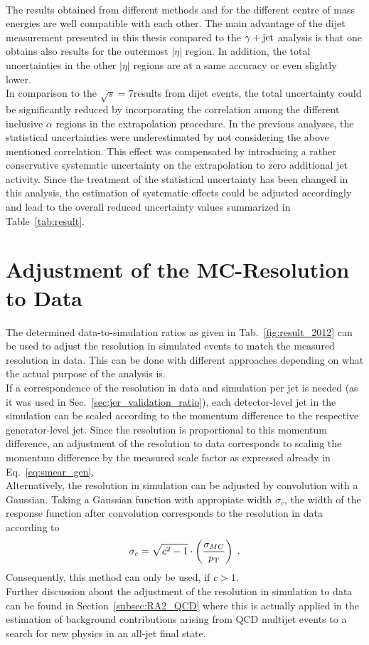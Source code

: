 \\
The results obtained from different methods and for the different centre of mass energies are well compatible with each other. The main advantage of the dijet measurement presented in this thesis compared to the $\gamma +\rm{jet}$ analysis is that one obtains also results for the outermost $|\eta|$ region. In addition, the total uncertainties in the other $|\eta|$ regions are at a same accuracy or even slightly lower. \\
In comparison to the $\sqrt{s}=7$\tev results from dijet events, the total uncertainty could be significantly reduced by incorporating the correlation among the different inclusive $\alpha$ regions in the extrapolation procedure. In the previous analyses, the statistical uncertainties were underestimated by not considering the above mentioned correlation. This effect was compensated by introducing a rather conservative systematic uncertainty on the extrapolation to zero additional jet activity. Since the treatment of the statistical uncertainty has been changed in this analysis, the estimation of systematic effects could be adjusted accordingly and lead to the overall reduced uncertainty values summarized in Table~\ref{tab:result}.

\section{Adjustment of the MC-Resolution to Data}
\label{sec:jer_adjustment}
The determined data-to-simulation ratios as given in Tab.~\ref{fig:result_2012} can be used to adjust the resolution in simulated events to match the measured resolution in data. This can be done with different approaches depending on what the actual purpose of the analysis is. \\
If a correspondence of the resolution in data and simulation per jet is needed (as it was used in Sec.~\ref{sec:jer_validation_ratio}), each detector-level jet in the simulation can be scaled according to the momentum difference to the respective generator-level jet. Since the resolution is proportional to this momentum difference, an adjustment of the resolution to data corresponds to scaling the momentum difference by the measured scale factor as expressed already in Eq.~\ref{eq:smear_gen}. \\
Alternatively, the resolution in simulation can be adjusted by convolution with a Gaussian. Taking a Gaussian function with appropiate width $\sigma_{c}$, the width of the response function after convolution corresponds to the resolution in data according to 
\begin{equation}
\sigma_{c} = \sqrt{c^2-1} \cdot \left( \frac{\sigma_{MC}}{p_{\text{T}}} \right) \; .
\label{eq:res_adjust}
\end{equation}
Consequently, this method can only be used, if $c > 1$. \\
Further discussion about the adjustment of the resolution in simulation to data can be found in Section~\ref{subsec:RA2_QCD} where this is actually applied in the estimation of background contributions arising from QCD multijet events to a search for new physics in an all-jet final state.  

